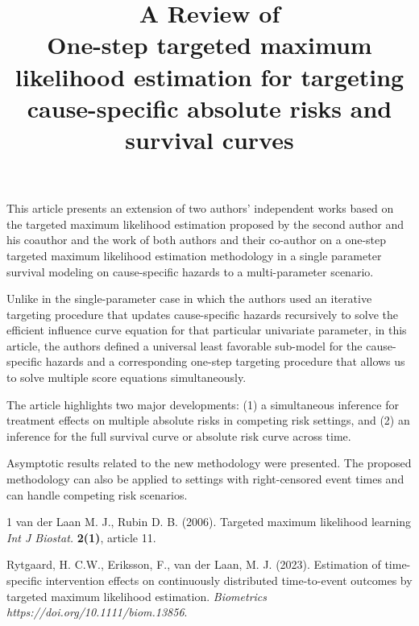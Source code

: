 \documentclass[11pt]{article}
\title{A Review of \\ One-step targeted maximum likelihood estimation for
	targeting cause-specific absolute risks and survival curves}
\begin{document}
	\maketitle	
	
This article presents an extension of two authors' independent works based on the targeted maximum likelihood estimation proposed by the second author and his coauthor \cite{1} and the work of both authors and their co-author \cite{2} on a one-step targeted maximum likelihood estimation methodology in a single parameter survival modeling on cause-specific hazards to a multi-parameter scenario. 


Unlike in the single-parameter case in which the authors used an iterative targeting procedure that updates cause-specific hazards recursively to solve the efficient influence curve equation for that particular univariate parameter, in this article, the authors defined a universal least favorable sub-model for the cause-specific hazards and a corresponding one-step targeting procedure that allows us to solve multiple score equations simultaneously. 

The article highlights two major developments:  (1) a simultaneous inference for treatment effects on multiple absolute risks in competing risk settings, and (2) an inference for the full survival curve or absolute risk curve across time. 

Asymptotic results related to the new methodology were presented. The proposed methodology can also be applied to settings with right-censored event times and can handle competing risk scenarios.

\begin{thebibliography}{1}
	 van der Laan M. J., Rubin D. B. (2006). Targeted maximum likelihood
	 learning \emph{Int J Biostat.} \textbf{2(1)}, article 11.
	
	 Rytgaard, H. C.W., Eriksson, F., van der Laan, M. J. (2023). Estimation of time-specific intervention effects on continuously distributed time-to-event outcomes by targeted maximum likelihood estimation. \emph{Biometrics} \textit{https://doi.org/10.1111/biom.13856}.
\end{thebibliography}
	
	
	
	
\end{document}
